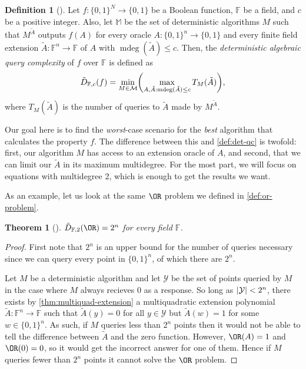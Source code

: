 \documentclass[english,12pt]{reedthesis}
\theoremstyle{plain}
\newtheorem{thm}{Theorem}[section]
\theoremstyle{definition}
\newtheorem{defn}[defn]{Definition}
\theoremstyle{remark}
\DeclareMathOperator{\mdeg}{mdeg}
\DeclarePairedDelimiter{\abs}{\lvert}{\rvert}
\begin{document}
\begin{defn}[{\cite[Def. 4.1]{AW09}}]\label{def:aqc}
  Let $f\colon \{0, 1\}^{N} \rightarrow \{0, 1\}$ be a Boolean function, $\mathbb{F}$ be a
  field, and $c$ be a positive integer. Also, let $\mathbb{M}$ be the set of
  deterministic algorithms $M$ such that $M^{\tilde{A}}$ outputs $f(A)$ for
  every oracle $A\colon \{0, 1\}^{n} \rightarrow \{0, 1\}$ and every finite field
  extension $\tilde{A}\colon \mathbb{F}^{n} \rightarrow \mathbb{F}$ of $A$ with
  $\mdeg(\tilde{A}) \le c$. Then, the \emph{deterministic algebraic query
    complexity} of $f$ over $\mathbb{F}$ is defined as
  \begin{equation}
    \tilde{D}_{\mathbb{F}, c}(f) = \min_{M \in \mathcal{M}}\mleft(
      \max_{A, \tilde{A}: \mdeg(\tilde{A}) \le c}T_{M}(\tilde{A})
    \mright),
  \end{equation}
  where $T_{M}(\tilde{A})$ is the number of queries to $\tilde{A}$ made by
  $M^{\tilde{A}}$.
\end{defn}

Our goal here is to find the \emph{worst}-case scenario for the \emph{best}
algorithm that calculates the property $f$. The difference between this and
\cref{def:det-qc} is twofold: first, our algorithm $M$ has access to
an extension oracle of $A$, and second, that we can limit our $\tilde{A}$ in
its maximum multidegree. For the most part, we will focus on equations with
multidegree 2, which is enough to get the results we want.

As an example, let us look at the same $\OR$ problem we defined in
\cref{def:or-problem}.

\begin{thm}[{\cite[Thm.\ 4.4]{AW09}}]\label{thm:or-algebraic}
  $\tilde{D}_{\mathbb{F},2}(\OR) = 2^{n}$ for every field $\mathbb{F}$.
\end{thm}

\begin{proof}
  First note that $2^{n}$ is an upper bound for the number of queries necessary
  since we can query every point in $\{0, 1\}^{n}$, of which there are $2^{n}$.

  Let $M$ be a deterministic algorithm and let $\mathcal{Y}$ be the set of points queried
  by $M$ in the case where $M$ always recieves $0$ as a response. So long as
  $\abs{\mathcal{Y}} < 2^{n}$, there exists by \cref{thm:multiquad-extension} a
  multiquadratic extension polynomial
  $\tilde{A}\colon \mathbb{F}^{n} \rightarrow \mathbb{F}$ such that $\tilde{A}(y) = 0$ for
  all $y \in \mathcal{Y}$ but $\tilde{A}(w) = 1$ for some $w \in \{0, 1\}^{n}$. As such, if
  $M$ queries less than $2^{n}$ points then it would not be able to tell the
  difference between $\tilde{A}$ and the zero function. However, $\OR(A) = 1$
  and $\OR(0) = 0$, so it would get the incorrect answer for one of them. Hence
  if $M$ queries fewer than $2^{n}$ points it cannot solve the $\OR$ problem.
\end{proof}
\end{document}
